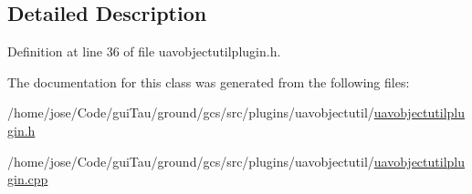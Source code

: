 \subsection{Detailed Description}


Definition at line 36 of file uavobjectutilplugin.\-h.



The documentation for this class was generated from the following files\-:\begin{DoxyCompactItemize}
\item 
/home/jose/\-Code/gui\-Tau/ground/gcs/src/plugins/uavobjectutil/\hyperlink{uavobjectutilplugin_8h}{uavobjectutilplugin.\-h}\item 
/home/jose/\-Code/gui\-Tau/ground/gcs/src/plugins/uavobjectutil/\hyperlink{uavobjectutilplugin_8cpp}{uavobjectutilplugin.\-cpp}\end{DoxyCompactItemize}
